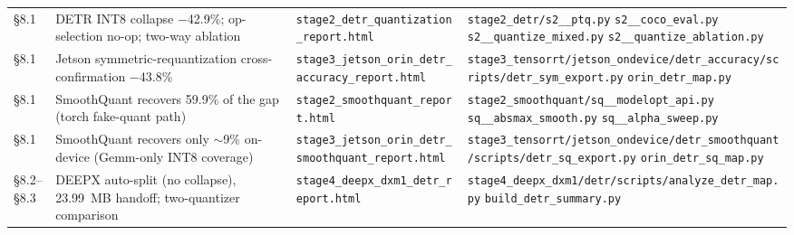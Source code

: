 \documentclass[11pt]{article}
\begin{document}
\begin{longtable}{L{0.9cm} L{4.0cm} L{4.3cm} L{5.0cm}}
\addlinespace[2pt]
\S8.1 & DETR INT8 collapse $-$42.9\%; op-selection no-op; two-way ablation & \texttt{stage2\_\allowbreak detr\_\allowbreak quantization\_\allowbreak report.html} & \texttt{stage2\_\allowbreak detr/\allowbreak s2\_\_\allowbreak ptq.py} \newline \texttt{s2\_\_\allowbreak coco\_\allowbreak eval.py} \newline \texttt{s2\_\_\allowbreak quantize\_\allowbreak mixed.py} \newline \texttt{s2\_\_\allowbreak quantize\_\allowbreak ablation.py} \\
\addlinespace[2pt]
\S8.1 & Jetson symmetric-requantization cross-confirmation $-$43.8\% & \texttt{stage3\_\allowbreak jetson\_\allowbreak orin\_\allowbreak detr\_\allowbreak accuracy\_\allowbreak report.html} & \texttt{stage3\_\allowbreak tensorrt/\allowbreak jetson\_\allowbreak ondevice/\allowbreak detr\_\allowbreak accuracy/\allowbreak scripts/\allowbreak detr\_\allowbreak sym\_\allowbreak export.py} \newline \texttt{orin\_\allowbreak detr\_\allowbreak map.py} \\
\addlinespace[2pt]
\S8.1 & SmoothQuant recovers 59.9\% of the gap (torch fake-quant path) & \texttt{stage2\_\allowbreak smoothquant\_\allowbreak report.html} & \texttt{stage2\_\allowbreak smoothquant/\allowbreak sq\_\_\allowbreak modelopt\_\allowbreak api.py} \newline \texttt{sq\_\_\allowbreak absmax\_\allowbreak smooth.py} \newline \texttt{sq\_\_\allowbreak alpha\_\allowbreak sweep.py} \\
\addlinespace[2pt]
\S8.1 & SmoothQuant recovers only ${\sim}$9\% on-device (Gemm-only INT8 coverage) & \texttt{stage3\_\allowbreak jetson\_\allowbreak orin\_\allowbreak detr\_\allowbreak smoothquant\_\allowbreak report.html} & \texttt{stage3\_\allowbreak tensorrt/\allowbreak jetson\_\allowbreak ondevice/\allowbreak detr\_\allowbreak smoothquant/\allowbreak scripts/\allowbreak detr\_\allowbreak sq\_\allowbreak export.py} \newline \texttt{orin\_\allowbreak detr\_\allowbreak sq\_\allowbreak map.py} \\
\addlinespace[2pt]
\S8.2--\S8.3 & DEEPX auto-split (no collapse), 23.99~MB handoff; two-quantizer comparison & \texttt{stage4\_\allowbreak deepx\_\allowbreak dxm1\_\allowbreak detr\_\allowbreak report.html} & \texttt{stage4\_\allowbreak deepx\_\allowbreak dxm1/\allowbreak detr/\allowbreak scripts/\allowbreak analyze\_\allowbreak detr\_\allowbreak map.py} \newline \texttt{build\_\allowbreak detr\_\allowbreak summary.py} \\

\end{longtable}
\end{document}
